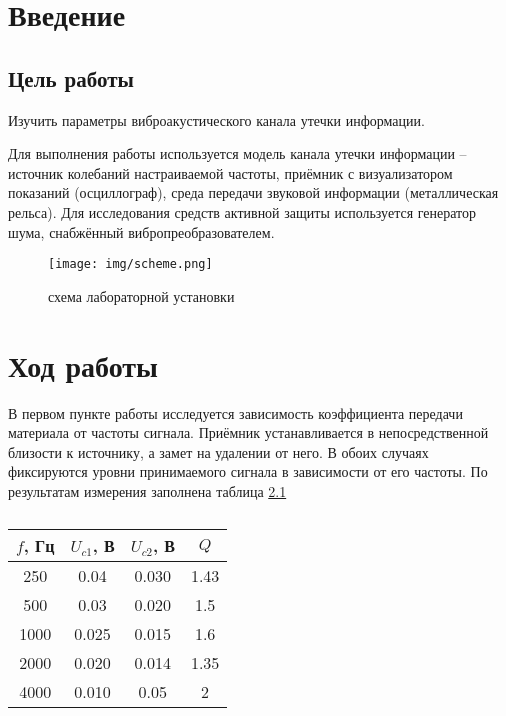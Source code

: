 \chapter{Введение}

\section{Цель работы}

Изучить параметры виброакустического канала утечки информации.

Для выполнения работы используется модель канала утечки информации – источник колебаний настраиваемой частоты, приёмник с визуализатором показаний (осциллограф), среда передачи звуковой информации (металлическая рельса). Для исследования средств активной защиты используется генератор шума, снабжённый вибропреобразователем.

\begin{figure}[H]
	\centering
	\texttt{[image: img/scheme.png]}
	\caption{схема лабораторной установки}
\end{figure}



\chapter{Ход работы}

В первом пункте работы исследуется зависимость коэффициента передачи материала от частоты сигнала. Приёмник устанавливается в непосредственной близости к источнику, а замет на удалении от него. В обоих случаях фиксируются уровни принимаемого сигнала в зависимости от его частоты. По результатам измерения заполнена таблица \ref{tbl:1}



\begin{table}
	\centering
	\caption{}
	\label{tbl:1}
	\begin{tabular}{|c|c|c|c|}
		\hline
		$f$, Гц & $U_{c1}$, В & $U_{c2}$, В & $Q$ \\ \hline
		250 & 0.04 & 0.030 & 1.43\\ \hline
		500 & 0.03 & 0.020 & 1.5 \\ \hline
		1000 & 0.025 & 0.015 & 1.6 \\ \hline
		2000 & 0.020 & 0.014 & 1.35 \\ \hline
		4000 & 0.010 & 0.05 & 2 \\ \hline 
	\end{tabular}
\end{table}

